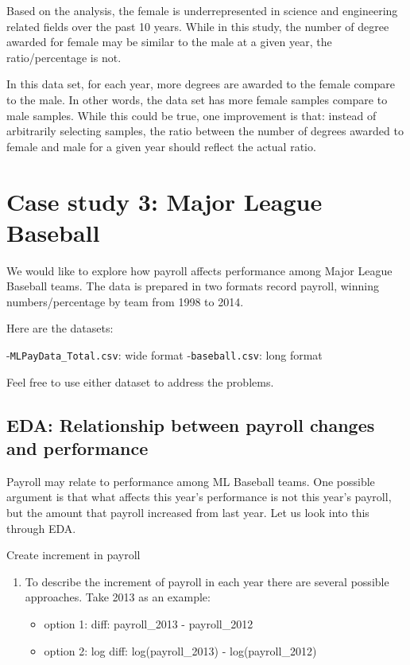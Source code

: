 \documentclass[
]{article}
\providecommand{\tightlist}{%
  \setlength{\itemsep}{0pt}\setlength{\parskip}{0pt}}
\begin{document}
Based on the analysis, the female is underrepresented in science and
engineering related fields over the past 10 years. While in this study,
the number of degree awarded for female may be similar to the male at a
given year, the ratio/percentage is not.

In this data set, for each year, more degrees are awarded to the female
compare to the male. In other words, the data set has more female
samples compare to male samples. While this could be true, one
improvement is that: instead of arbitrarily selecting samples, the ratio
between the number of degrees awarded to female and male for a given
year should reflect the actual ratio.

\hypertarget{case-study-3-major-league-baseball}{%
\section{Case study 3: Major League
Baseball}\label{case-study-3-major-league-baseball}}

We would like to explore how payroll affects performance among Major
League Baseball teams. The data is prepared in two formats record
payroll, winning numbers/percentage by team from 1998 to 2014.

Here are the datasets:

-\texttt{MLPayData\_Total.csv}: wide format -\texttt{baseball.csv}: long
format

Feel free to use either dataset to address the problems.

\hypertarget{eda-relationship-between-payroll-changes-and-performance}{%
\subsection{EDA: Relationship between payroll changes and
performance}\label{eda-relationship-between-payroll-changes-and-performance}}

Payroll may relate to performance among ML Baseball teams. One possible
argument is that what affects this year's performance is not this year's
payroll, but the amount that payroll increased from last year. Let us
look into this through EDA.

Create increment in payroll

\begin{enumerate}
\def\labelenumi{\roman{enumi}.}
\item
  To describe the increment of payroll in each year there are several
  possible approaches. Take 2013 as an example:

  \begin{itemize}
  \tightlist
  \item
    option 1: diff: payroll\_2013 - payroll\_2012
  \item
    option 2: log diff: log(payroll\_2013) - log(payroll\_2012)
  \end{itemize}
\end{enumerate}
\end{document}
